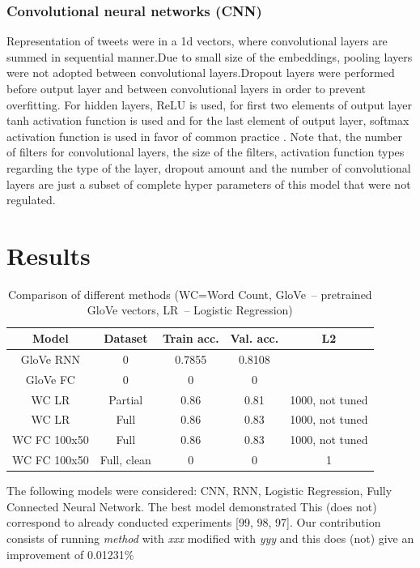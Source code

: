 \documentclass[10pt,conference,compsocconf]{IEEEtran}
\begin{document}
\subsubsection{Convolutional neural networks (CNN)}

Representation of tweets were in a 1d vectors, where convolutional layers are summed in sequential manner.Due to small size of the embeddings, pooling layers were not adopted between convolutional layers.Dropout layers were performed before output layer and between convolutional layers \cite{cnn5} in order to prevent overfitting. For hidden layers, ReLU is used, for first two elements of output layer tanh activation function is used and for the last element of output layer, softmax activation function is used in favor of common practice \cite{cnn6}.
Note that, the number of filters for convolutional layers, the size of the filters, activation function types regarding the type of the layer, dropout amount and the number of convolutional layers are just a subset of complete hyper parameters of this model that were not regulated.

\section{Results}
\begin{table}[ht]
	\centering
	\tiny
	\begin{tabular}{|c | c |  c | c | c |} 
		\hline
		Model & Dataset & Train acc. & Val. acc. & L2 \\
		\hline
		GloVe RNN & 0 & 0.7855 & 0.8108 &   \\ 
		\hline
		GloVe FC & 0 & 0 & 0 & \\
		\hline
		WC LR & Partial & 0.86 & 0.81 & 1000, not tuned\\
		\hline
		WC LR & Full & 0.86 & 0.83 & 1000, not tuned\\
		\hline
		WC FC 100x50 & Full & 0.86 & 0.83 & 1000, not tuned\\
		\hline
		WC FC 100x50 & Full, clean & 0 & 0 & 1\\ [1ex] 
		\hline
	\end{tabular}
	\caption{Comparison of different methods (WC=Word Count, GloVe~-- pretrained GloVe vectors, LR~-- Logistic Regression)}
	\label{tab:results}
\end{table}

The following models were considered: CNN, RNN, Logistic Regression, Fully Connected Neural Network. The best model demonstrated This (does not) correspond to already conducted experiments [99, 98, 97]. Our contribution consists of running {\em method} with {\em xxx} modified with {\em yyy} and this does (not) give an improvement of 0.01231\%
\end{document}
